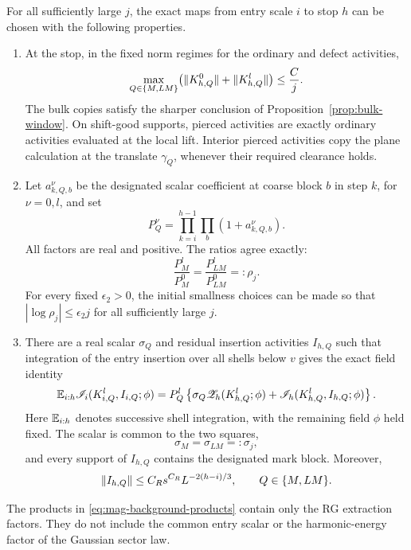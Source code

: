 \begin{proposition}\label{prop:magnetic}
For all sufficiently large $j$, the exact maps from entry scale $i$
to stop $h$ can be chosen with the following properties.
\begin{enumerate}
\item At the stop, in the fixed norm regimes for the ordinary and
defect activities,
\begin{equation}\label{eq:mag-small-backgrounds}
 \max_{Q\in\{M,LM\}}
 \bigl(\lVert K^0_{h,Q}\rVert+\lVert K^l_{h,Q}\rVert\bigr)\le \frac{C}{j}.
\end{equation}
The bulk copies satisfy the sharper conclusion of
Proposition~\ref{prop:bulk-window}.  On shift-good supports, pierced
activities are exactly ordinary activities evaluated at the local
lift.  Interior pierced activities copy the plane calculation at
the translate $\gamma_Q$, whenever their required clearance holds.

\item Let $a^\nu_{k,Q,b}$ be the designated scalar coefficient at
coarse block $b$ in step $k$, for $\nu=0,l$, and set
\begin{equation}\label{eq:mag-background-products}
 P^\nu_Q=\prod_{k=i}^{h-1}\prod_b(1+a^\nu_{k,Q,b}).
\end{equation}
All factors are real and positive.  The ratios agree exactly:
\begin{equation}\label{eq:mag-common-background-ratio}
 \frac{P^l_M}{P^0_M}=\frac{P^l_{LM}}{P^0_{LM}}=:\rho_j.
\end{equation}
For every fixed $\epsilon_2>0$, the initial smallness choices can
be made so that $|\log\rho_j|\le\epsilon_2j$ for all sufficiently
large $j$.

\item There are a real scalar $\sigma_Q$ and residual insertion
activities $I_{h,Q}$ such that integration of the entry insertion
over all shells below $v$ gives the exact field identity
\begin{equation}\label{eq:mag-insertion-identity}
 \mathbb E_{i:h}\mathscr I_i(K^l_{i,Q},I_{i,Q};\phi)
 =P^l_Q\left\{
    \sigma_Q\mathscr Z_h(K^l_{h,Q};\phi)
       +\mathscr I_h(K^l_{h,Q},I_{h,Q};\phi)\right\}.
\end{equation}
Here $\mathbb E_{i:h}$ denotes successive shell integration, with the
remaining field $\phi$ held fixed.  The scalar is common to the
two squares,
\begin{equation}\label{eq:mag-common-insertion-scalar}
 \sigma_M=\sigma_{LM}=: \sigma_j,
\end{equation}
and every support of $I_{h,Q}$ contains the designated mark block.
Moreover,
\begin{equation}\label{eq:mag-insertion-bound}
 \lVert I_{h,Q}\rVert\le C_Rs^{C_R}L^{-2(h-i)/3},
 \qquad Q\in\{M,LM\}.
\end{equation}
\end{enumerate}
The products in \eqref{eq:mag-background-products} contain only
the RG extraction factors.  They do not include the common entry
scalar or the harmonic-energy factor of the Gaussian sector law.
\end{proposition}

